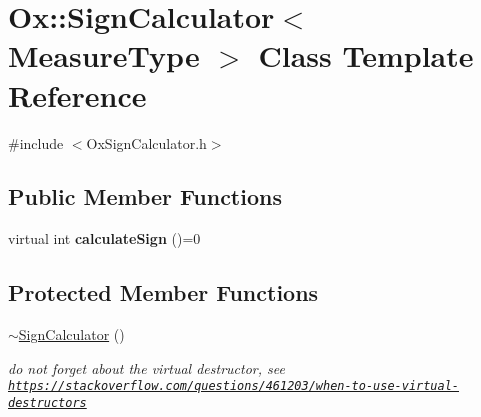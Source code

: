 \hypertarget{class_ox_1_1_sign_calculator}{}\section{Ox\+:\+:Sign\+Calculator$<$ Measure\+Type $>$ Class Template Reference}
\label{class_ox_1_1_sign_calculator}


{\ttfamily \#include $<$Ox\+Sign\+Calculator.\+h$>$}

\subsection*{Public Member Functions}
\begin{DoxyCompactItemize}
\item 
\mbox{\label{class_ox_1_1_sign_calculator_a6a85028b70e41f6a60a5b639c468e455}} 
virtual int {\bfseries calculate\+Sign} ()=0
\end{DoxyCompactItemize}
\subsection*{Protected Member Functions}
\begin{DoxyCompactItemize}
\item 
\mbox{\label{class_ox_1_1_sign_calculator_af8ee36b6dd5845c7b76ae4736b84f5d1}} 
\mbox{\hyperlink{class_ox_1_1_sign_calculator_af8ee36b6dd5845c7b76ae4736b84f5d1}{$\sim$\+Sign\+Calculator}} ()
\begin{DoxyCompactList}\small\item\em do not forget about the virtual destructor, see \href{https://stackoverflow.com/questions/461203/when-to-use-virtual-destructors}{\tt https\+://stackoverflow.\+com/questions/461203/when-\/to-\/use-\/virtual-\/destructors} \end{DoxyCompactList}\end{DoxyCompactItemize}
